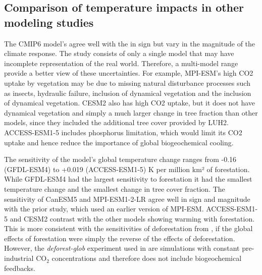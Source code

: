 \documentclass[]{article}
\begin{document}
\subsection{Comparison of temperature impacts in other modeling studies}

The CMIP6 model's agree well with the \cite{sonntag_quantifying_2018} in sign but vary in the magnitude of the climate response.
The \cite{sonntag_quantifying_2018} study consists of only a single model that may have incomplete representation of the real world.
Therefore, a multi-model range provide a better view of these uncertainties.
For example, MPI-ESM's high CO2 uptake by vegetation may be due to missing natural disturbance processes such as insects, hydraulic failure, inclusion of dynamical vegetation and the inclusion of dynamical vegetation.
CESM2 also has high CO2 uptake, but it does not have dynamical vegetation and simply a much larger change in tree fraction than other models, since they included the additional tree cover provided by LUH2.
ACCESS-ESM1-5 includes phosphorus limitation, which would limit its CO2 uptake and hence reduce the importance of global biogeochemical cooling.

The sensitivity of the model's global temperature change ranges from -0.16 (GFDL-ESM4) to +0.019 (ACCESS-ESM1-5) K per million km² of forestation.
While GFDL-ESM4 had the largest sensitivity to forestation it had the smallest temperature change and the smallest change in tree cover fraction.
The sensitivity of CanESM5 and MPI-ESM1-2-LR agree well in sign and magnitude with the prior \cite{sonntag_quantifying_2018} study, which used an earlier version of MPI-ESM.
ACCESS-ESM1-5 and CESM2 contrast with the other models showing warming with forestation.
This is more consistent with the sensitivities of deforestation from \cite{boysen_global_2020}, if the global effects of forestation were simply the reverse of the effects of deforestation.
However, the \textit{deforest-glob} experiment used in \cite{boysen_global_2020} are simulations with constant pre-industrial CO$_2$ concentrations and therefore does not include biogeochemical feedbacks.
\end{document}
